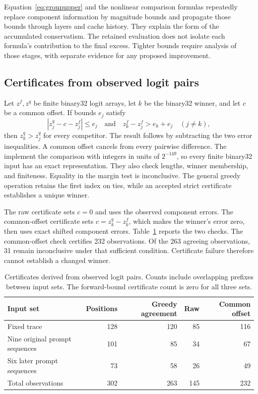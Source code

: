 Equation~\eqref{eq:groupupper} and the nonlinear comparison formulas repeatedly replace component information by magnitude bounds and propagate those bounds through layers and cache history.  They explain the form of the accumulated conservatism.  The retained evaluation does not isolate each formula's contribution to the final excess.  Tighter bounds require analysis of those stages, with separate evidence for any proposed improvement.

\subsection{Certificates from observed logit pairs}

Let $z^f,z^q$ be finite binary32 logit arrays, let $k$ be the binary32 winner, and let $c$ be a common offset.  If bounds $e_j$ satisfy
\[
 |z^q_j-c-z^f_j|\leq e_j
 \quad\text{and}\quad
 z^f_k-z^f_j>e_k+e_j\quad(j\ne k),
\]
then $z^q_k>z^q_j$ for every competitor.  The result follows by subtracting the two error inequalities.  A common offset cancels from every pairwise difference.  The  implement the comparison with integers in units of $2^{-149}$, so every finite binary32 input has an exact representation.  They also check lengths, winner membership, and finiteness.  Equality in the margin test is inconclusive.  The general greedy operation retains the first index on ties, while an accepted strict certificate establishes a unique winner.

The raw certificate sets $c=0$ and uses the observed component errors.  The common-offset certificate sets $c=z^q_k-z^f_k$, which makes the winner's error zero, then uses exact shifted component errors.  Table~\ref{tab:certificates} reports the two checks.  The common-offset check certifies 232 observations.  Of the 263 agreeing observations, 31 remain inconclusive under that sufficient condition.  Certificate failure therefore cannot establish a changed winner.

\begin{table}[ht]
\centering
\small
\begin{tabular}{lrrrr}
\toprule
Input set & Positions & Greedy agreement & Raw & Common offset\\
\midrule
Fixed trace & 128 & 120 & 85 & 116\\
Nine original prompt sequences & 101 & 85 & 34 & 67\\
Six later prompt sequences & 73 & 58 & 26 & 49\\
\midrule
Total observations & 302 & 263 & 145 & 232\\
\bottomrule
\end{tabular}
\caption{Certificates derived from observed logit pairs.  Counts include overlapping prefixes between input sets.  The forward-bound certificate count is zero for all three sets.}
\label{tab:certificates}
\end{table}

